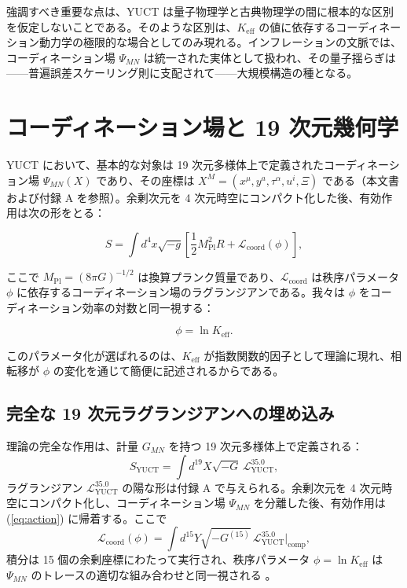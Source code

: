 \documentclass[11pt,a4paper]{article}
\newcommand{\Keff}{K_{\mathrm{eff}}}
\newcommand{\Mpl}{M_{\mathrm{Pl}}}
\begin{document}
	強調すべき重要な点は、YUCT は量子物理学と古典物理学の間に根本的な区別を仮定しないことである。そのような区別は、\(K_{\mathrm{eff}}\) の値に依存するコーディネーション動力学の極限的な場合としてのみ現れる。インフレーションの文脈では、コーディネーション場 \(\Psi_{MN}\) は統一された実体として扱われ、その量子揺らぎは——普遍誤差スケーリング則に支配されて——大規模構造の種となる。
	
	\section{コーディネーション場と 19 次元幾何学}
	\label{sec:field}
	
	YUCT において、基本的な対象は 19 次元多様体上で定義されたコーディネーション場 \(\Psi_{MN}(X)\) であり、その座標は \(X^M = (x^\mu, y^a, \tau^\alpha, u^i, \Xi)\) である（本文書および付録 A を参照）。余剰次元を 4 次元時空にコンパクト化した後、有効作用は次の形をとる：
	
	\begin{equation}
		S = \int d^4x \sqrt{-g} \left[ \frac{1}{2} \Mpl^2 R + \mathcal{L}_{\mathrm{coord}}(\phi) \right],
		\label{eq:action}
	\end{equation}
	
	ここで \(\Mpl = (8\pi G)^{-1/2}\) は換算プランク質量であり、\(\mathcal{L}_{\mathrm{coord}}\) は秩序パラメータ \(\phi\) に依存するコーディネーション場のラグランジアンである。我々は \(\phi\) をコーディネーション効率の対数と同一視する：
	
	\begin{equation}
		\phi = \ln \Keff.
		\label{eq:phi-def}
	\end{equation}
	
	このパラメータ化が選ばれるのは、\(\Keff\) が指数関数的因子として理論に現れ、相転移が \(\phi\) の変化を通じて簡便に記述されるからである。
	
	\subsection{完全な 19 次元ラグランジアンへの埋め込み}
	
	理論の完全な作用は、計量 \(G_{MN}\) を持つ 19 次元多様体上で定義される：
	\begin{equation}
		S_{\text{YUCT}} = \int d^{19}X \sqrt{-G} \, \mathcal{L}_{\text{YUCT}}^{35.0},
		\label{eq:full-action}
	\end{equation}
	ラグランジアン \(\mathcal{L}_{\text{YUCT}}^{35.0}\) の陽な形は付録 A で与えられる。余剰次元を 4 次元時空にコンパクト化し、コーディネーション場 \(\Psi_{MN}\) を分離した後、有効作用は (\ref{eq:action}) に帰着する。ここで
	\begin{equation}
		\mathcal{L}_{\mathrm{coord}}(\phi) = \int d^{15}Y \sqrt{-G^{(15)}} \, \mathcal{L}_{\text{YUCT}}^{35.0}\big|_{\text{comp}},
	\end{equation}
	積分は 15 個の余剰座標にわたって実行され、秩序パラメータ \(\phi = \ln\Keff\) は \(\Psi_{MN}\) のトレースの適切な組み合わせと同一視される \cite{Yakushev2026}。
	
\end{document}
